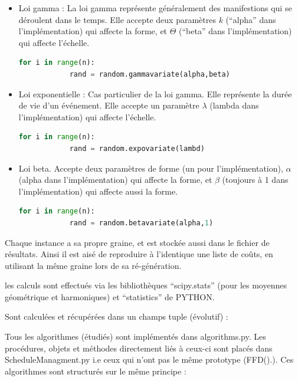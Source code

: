 \documentclass[a4paper,12pt]{report}
\theoremstyle{plain}				%
\theoremstyle{definition}				%
\begin{document}
\begin{appendices}
\begin{itemize}
\item Loi gamma : La loi gamma représente généralement des manifestions qui se déroulent dans le temps. Elle accepte deux paramètres $k$ (``alpha'' dans l'implémentation) qui affecte la forme, et $\Theta$ (``beta'' dans l’implémentation) qui affecte l'échelle.  
  \begin{lstlisting}[language=Python]
	for i in range(n):
    		rand = random.gammavariate(alpha,beta)
  \end{lstlisting}
\item Loi exponentielle : Cas particulier de la loi gamma. Elle représente la durée de vie d'un événement. Elle accepte un paramètre $\lambda$ (lambda dans l'implémentation) qui affecte l'échelle.  
  \begin{lstlisting}[language=Python]
	for i in range(n):
    		rand = random.expovariate(lambd)
  \end{lstlisting}

\item Loi beta. Accepte deux paramètres de forme (un pour l'implémentation), $\alpha$ (alpha dans l’implémentation) qui affecte la forme, et $\beta$ (toujours à 1 dans l'implémentation) qui affecte aussi la forme.
  \begin{lstlisting}[language=Python]
	for i in range(n):
    		rand = random.betavariate(alpha,1)
  \end{lstlisting}

\end{itemize}

\bigskip
Chaque instance a sa propre graine, et est stockée aussi dans le fichier de résultats. 
Ainsi il est aisé de reproduire à l'identique une liste de coûts, en utilisant la même graine 
  lors de sa ré-génération. 
 
les calculs sont effectués via les bibliothèques ``scipy.stats'' (pour les moyennes géométrique 
  et harmoniques) et ``statistics'' de PYTHON.

Sont calculées et récupérées dans un champs tuple (évolutif) :


Tous les algorithmes (étudiés) sont implémentés dans algorithms.py. Les procédures, objets et méthodes directement liés à ceux-ci sont placés dans ScheduleManagment.py i.e ceux qui n'ont pas le même prototype (FFD().). 
Ces algorithmes sont structurés sur le même principe :
\begin{itemize}


\end{itemize}
\end{appendices}
\end{document}
